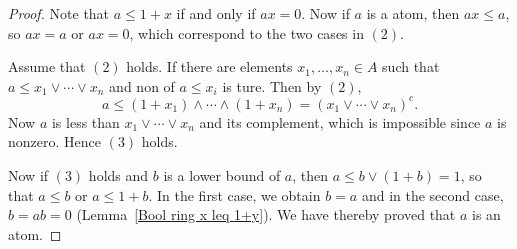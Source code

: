 \begin{proof}
Note that $a\leq 1+x$ if and only if $ax=0$. Now if $a$ is a atom, then $ax\leq a$, so $ax=a$ or $ax=0$, which correspond to the two cases in $(2)$.\par
Assume that $(2)$ holds. If there are elements $x_1,\dots,x_n\in A$ such that $a\leq x_1\vee\cdots\vee x_n$ and non of $a\leq x_i$ is ture. Then by $(2)$,
\[a\leq(1+x_1)\wedge\cdots\wedge(1+x_n)=(x_1\vee\cdots\vee x_n)^c.\]
Now $a$ is less than $x_1\vee\cdots\vee x_n$ and its complement, which is impossible since $a$ is nonzero. Hence $(3)$ holds.\par
Now if $(3)$ holds and $b$ is a lower bound of $a$, then $a\leq b\vee(1+b)=1$, so that $a\leq b$ or $a\leq 1+b$. In the first case, we obtain $b=a$ and
in the second case, $b=ab=0$ (Lemma~\ref{Bool ring x leq 1+y}). We have thereby proved that $a$ is an atom.
\end{proof}
